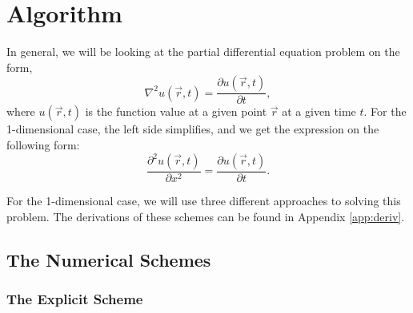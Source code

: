 \documentclass[reprint,english,notitlepage]{revtex4-1}  %
\begin{document}
\newpage

\section{Algorithm}

In general, we will be looking at the partial differential equation problem on the form,
\begin{equation}\label{eq:ognabla}
    \nabla^2u(\Vec{r},t) = \frac{\partial u(\Vec{r},t)}{\partial t},
\end{equation}
where $u(\Vec{r},t)$ is the function value at a given point $\Vec{r}$ at a given time $t$. For the 1-dimensional case, the left side simplifies, and we get the expression on the following form:
\begin{equation}\label{eq:origexplicit}
    \frac{\partial^2 u(\Vec{r},t)}{\partial x^2} = \frac{\partial u(\Vec{r},t)}{\partial t}.
\end{equation}

For the 1-dimensional case, we will use three different approaches to solving this problem. The derivations of these schemes can be found in Appendix \ref{app:deriv}.

\subsection{The Numerical Schemes}

\subsubsection{The Explicit Scheme}
\end{document}
